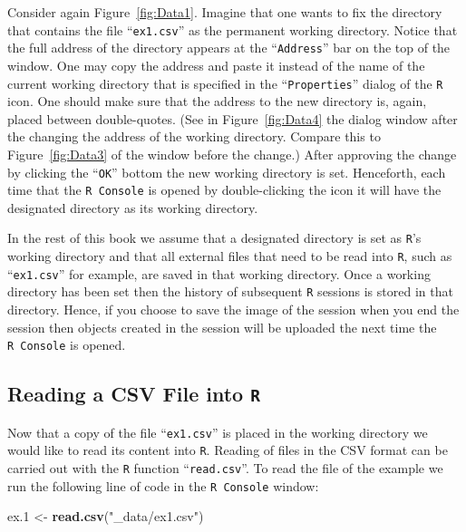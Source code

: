 \documentclass[]{krantz}
\makeatletter
\newenvironment{Shaded}{\begin{snugshade}}{\end{snugshade}}
\newcommand{\KeywordTok}[1]{\textcolor[rgb]{0.13,0.29,0.53}{\textbf{#1}}}
\newcommand{\DecValTok}[1]{\textcolor[rgb]{0.00,0.00,0.81}{#1}}
\newcommand{\StringTok}[1]{\textcolor[rgb]{0.31,0.60,0.02}{#1}}
\newcommand{\NormalTok}[1]{#1}
\newenvironment{kframe}{%
\medskip{}
\setlength{\fboxsep}{.8em}
 \def\at@end@of@kframe{}%
 \ifinner\ifhmode%
  \def\at@end@of@kframe{\end{minipage}}%
  \begin{minipage}{\columnwidth}%
 \fi\fi%
 \def\FrameCommand##1{\hskip\@totalleftmargin \hskip-\fboxsep
 \colorbox{shadecolor}{##1}\hskip-\fboxsep
     \hskip-\linewidth \hskip-\@totalleftmargin \hskip\columnwidth}%
 \MakeFramed {\advance\hsize-\width
   \@totalleftmargin\z@ \linewidth\hsize
   \@setminipage}}%
 {\par\unskip\endMakeFramed%
 \at@end@of@kframe}
\renewenvironment{Shaded}{\begin{kframe}}{\end{kframe}}
\theoremstyle{definition}
\theoremstyle{definition}
\theoremstyle{definition}
\theoremstyle{remark}
\makeatother
\begin{document}
Consider again Figure~\ref{fig:Data1}. Imagine that one wants to fix the
directory that contains the file ``\texttt{ex1.csv}'' as the permanent
working directory. Notice that the full address of the directory appears
at the ``\texttt{Address}'' bar on the top of the window. One may copy
the address and paste it instead of the name of the current working
directory that is specified in the ``\texttt{Properties}'' dialog of the
\texttt{R} icon. One should make sure that the address to the new
directory is, again, placed between double-quotes. (See in
Figure~\ref{fig:Data4} the dialog window after the changing the address
of the working directory. Compare this to Figure~\ref{fig:Data3} of the
window before the change.) After approving the change by clicking the
``\texttt{OK}'' bottom the new working directory is set. Henceforth,
each time that the \texttt{R\ Console} is opened by double-clicking the
icon it will have the designated directory as its working directory.

In the rest of this book we assume that a designated directory is set as
\texttt{R}'s working directory and that all external files that need to
be read into \texttt{R}, such as ``\texttt{ex1.csv}'' for example, are
saved in that working directory. Once a working directory has been set
then the history of subsequent \texttt{R} sessions is stored in that
directory. Hence, if you choose to save the image of the session when
you end the session then objects created in the session will be uploaded
the next time the \texttt{R\ Console} is opened.

\subsection{\texorpdfstring{Reading a CSV File into
\texttt{R}}{Reading a CSV File into R}}\label{Data_3}

Now that a copy of the file ``\texttt{ex1.csv}'' is placed in the
working directory we would like to read its content into \texttt{R}.
Reading of files in the CSV format can be carried out with the
\texttt{R} function ``\texttt{read.csv}''. To read the file of the
example we run the following line of code in the \texttt{R\ Console}
window:

\begin{Shaded}
\begin{Highlighting}[]
\NormalTok{ex.}\DecValTok{1}\NormalTok{ <-}\StringTok{ }\KeywordTok{read.csv}\NormalTok{(}\StringTok{"_data/ex1.csv"}\NormalTok{)}
\end{Highlighting}
\end{Shaded}
\end{document}
